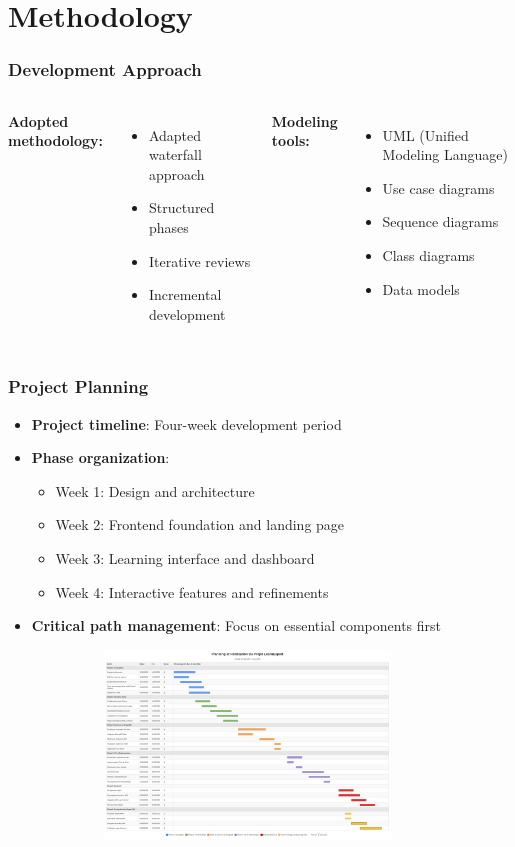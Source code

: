 \documentclass{beamer}
\begin{document}
\section{Methodology}

\begin{frame}
\frametitle{Development Approach}
\begin{columns}
\textbf{Adopted methodology:}
\begin{itemize}
    \item Adapted waterfall approach
    \item Structured phases
    \item Iterative reviews
    \item Incremental development
\end{itemize}

\textbf{Modeling tools:}
\begin{itemize}
    \item UML (Unified Modeling Language)
    \item Use case diagrams
    \item Sequence diagrams
    \item Class diagrams
    \item Data models
\end{itemize}
\end{columns}
\end{frame}

\begin{frame}
\frametitle{Project Planning}
\begin{itemize}
    \item \textbf{Project timeline}: Four-week development period
    \item \textbf{Phase organization}:
    \begin{itemize}
        \item Week 1: Design and architecture
        \item Week 2: Frontend foundation and landing page
        \item Week 3: Learning interface and dashboard
        \item Week 4: Interactive features and refinements
    \end{itemize}
    \item \textbf{Critical path management}: Focus on essential components first
\end{itemize}
\begin{center}
    \includegraphics[width=0.95\textwidth,height=5cm,keepaspectratio]{Screenshot 2025-06-08 at 20-35-06 Planning du Projet LearnExpert - Diagramme de Gantt.png}
\end{center}
\end{frame}
\end{document}
